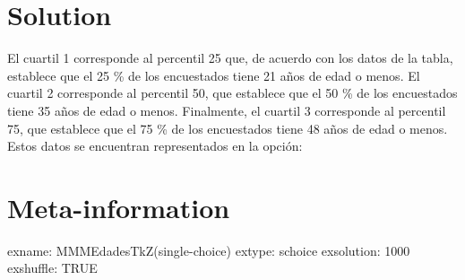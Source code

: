 \documentclass[
]{article}
\begin{document}
\hypertarget{solution}{%
\section{Solution}\label{solution}}

El cuartil 1 corresponde al percentil 25 que, de acuerdo con los datos
de la tabla, establece que el 25 \% de los encuestados tiene 21 años de
edad o menos. El cuartil 2 corresponde al percentil 50, que establece
que el 50 \% de los encuestados tiene 35 años de edad o menos.
Finalmente, el cuartil 3 corresponde al percentil 75, que establece que
el 75 \% de los encuestados tiene 48 años de edad o menos. Estos datos
se encuentran representados en la opción:

\hfill\break


\hypertarget{meta-information}{%
\section{Meta-information}\label{meta-information}}

exname: MMMEdadesTkZ(single-choice) extype: schoice exsolution: 1000
exshuffle: TRUE
\end{document}
